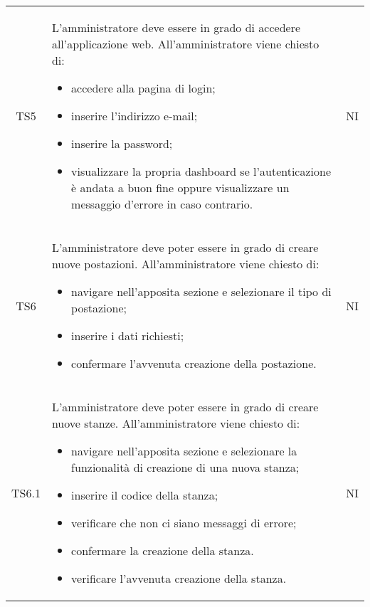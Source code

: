 {\begin{longtable}{ c C{11cm} c }
        TS5&
        \begin{flushleft}
            L'amministratore deve essere in grado di accedere all'applicazione web.
            All'amministratore viene chiesto di:
        \end{flushleft}
        \begin{itemize}
            \item accedere alla pagina di login;
            \item inserire l'indirizzo e-mail;
            \item inserire la password;
            \item visualizzare la propria dashboard se l'autenticazione è andata a buon fine oppure visualizzare un messaggio d'errore in caso contrario.
        \end{itemize}&
        NI\\

        TS6&
        \begin{flushleft}
            L'amministratore deve poter essere in grado di creare nuove postazioni.
            All'amministratore viene chiesto di:
        \end{flushleft}
        \begin{itemize}
            \item navigare nell'apposita sezione e selezionare il tipo di postazione;
            \item inserire i dati richiesti;
            \item confermare l'avvenuta creazione della postazione.
        \end{itemize}&
        NI\\

        TS6.1&
        \begin{flushleft}
            L'amministratore deve poter essere in grado di creare nuove stanze.
            All'amministratore viene chiesto di:
        \end{flushleft}
        \begin{itemize}
            \item navigare nell'apposita sezione e selezionare la funzionalità di creazione di una nuova stanza;
            \item inserire il codice della stanza;
            \item verificare che non ci siano messaggi di errore;
            \item confermare la creazione della stanza.
            \item verificare l'avvenuta creazione della stanza.
        \end{itemize}&
        NI\\


\end{longtable}}
